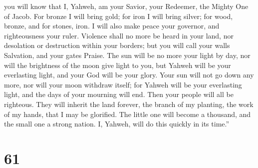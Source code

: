 you will know that I, Yahweh, am your Savior, your Redeemer, the Mighty
One of Jacob.  For bronze I will bring gold; for iron I
will bring silver; for wood, bronze, and for stones, iron. I will also
make peace your governor, and righteousness your ruler. 
Violence shall no more be heard in your land, nor desolation or
destruction within your borders; but you will call your walls Salvation,
and your gates Praise.  The sun will be no more your
light by day, nor will the brightness of the moon give light to you, but
Yahweh will be your everlasting light, and your God will be your glory.
 Your sun will not go down any more, nor will your moon
withdraw itself; for Yahweh will be your everlasting light, and the days
of your mourning will end.  Then your people will all be
righteous. They will inherit the land forever, the branch of my
planting, the work of my hands, that I may be glorified. 
The little one will become a thousand, and the small one a strong
nation. I, Yahweh, will do this quickly in its time.''

\hypertarget{section-58}{%
\section{61}\label{section-58}}

